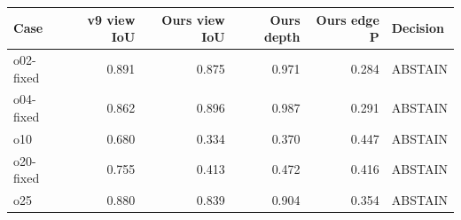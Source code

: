 \begin{tabular}{lrrrrl}
\toprule
Case & v9 view IoU & Ours view IoU & Ours depth & Ours edge P & Decision \\
\midrule
o02-fixed & 0.891 & 0.875 & 0.971 & 0.284 & ABSTAIN \\
o04-fixed & 0.862 & 0.896 & 0.987 & 0.291 & ABSTAIN \\
o10 & 0.680 & 0.334 & 0.370 & 0.447 & ABSTAIN \\
o20-fixed & 0.755 & 0.413 & 0.472 & 0.416 & ABSTAIN \\
o25 & 0.880 & 0.839 & 0.904 & 0.354 & ABSTAIN \\
\bottomrule
\end{tabular}
